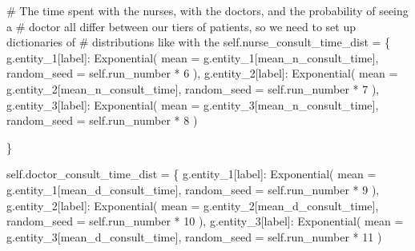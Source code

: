 \documentclass[
  letterpaper,
  DIV=11,
  numbers=noendperiod]{scrreprt}
\newenvironment{Shaded}{}{}
\newcommand{\CommentTok}[1]{\textcolor[rgb]{0.42,0.45,0.49}{#1}}
\newcommand{\DecValTok}[1]{\textcolor[rgb]{0.00,0.36,0.77}{#1}}
\newcommand{\NormalTok}[1]{\textcolor[rgb]{0.14,0.16,0.18}{#1}}
\newcommand{\OperatorTok}[1]{\textcolor[rgb]{0.14,0.16,0.18}{#1}}
\newcommand{\StringTok}[1]{\textcolor[rgb]{0.01,0.18,0.38}{#1}}
\newcommand{\VariableTok}[1]{\textcolor[rgb]{0.89,0.38,0.04}{#1}}
\begin{document}
\begin{Shaded}
\begin{Highlighting}[]
        \CommentTok{\# The time spent with the nurses, with the doctors, and the probability of seeing a}
        \CommentTok{\# doctor all differ between our tiers of patients, so we need to set up dictionaries of}
        \CommentTok{\# distributions like with the}
        \VariableTok{self}\NormalTok{.nurse\_consult\_time\_dist }\OperatorTok{=}\NormalTok{ \{}
\NormalTok{            g.entity\_1[}\StringTok{\textquotesingle{}label\textquotesingle{}}\NormalTok{]: Exponential(}
\NormalTok{                mean }\OperatorTok{=}\NormalTok{ g.entity\_1[}\StringTok{\textquotesingle{}mean\_n\_consult\_time\textquotesingle{}}\NormalTok{],}
\NormalTok{                random\_seed }\OperatorTok{=} \VariableTok{self}\NormalTok{.run\_number }\OperatorTok{*} \DecValTok{6}
\NormalTok{                ),}
\NormalTok{            g.entity\_2[}\StringTok{\textquotesingle{}label\textquotesingle{}}\NormalTok{]: Exponential(}
\NormalTok{                mean }\OperatorTok{=}\NormalTok{ g.entity\_2[}\StringTok{\textquotesingle{}mean\_n\_consult\_time\textquotesingle{}}\NormalTok{],}
\NormalTok{                random\_seed }\OperatorTok{=} \VariableTok{self}\NormalTok{.run\_number }\OperatorTok{*} \DecValTok{7}
\NormalTok{                ),}
\NormalTok{            g.entity\_3[}\StringTok{\textquotesingle{}label\textquotesingle{}}\NormalTok{]: Exponential(}
\NormalTok{                mean }\OperatorTok{=}\NormalTok{ g.entity\_3[}\StringTok{\textquotesingle{}mean\_n\_consult\_time\textquotesingle{}}\NormalTok{],}
\NormalTok{                random\_seed }\OperatorTok{=} \VariableTok{self}\NormalTok{.run\_number }\OperatorTok{*} \DecValTok{8}
\NormalTok{                )}

\NormalTok{        \}}

        \VariableTok{self}\NormalTok{.doctor\_consult\_time\_dist }\OperatorTok{=}\NormalTok{ \{}
\NormalTok{            g.entity\_1[}\StringTok{\textquotesingle{}label\textquotesingle{}}\NormalTok{]: Exponential(}
\NormalTok{                mean }\OperatorTok{=}\NormalTok{ g.entity\_1[}\StringTok{\textquotesingle{}mean\_d\_consult\_time\textquotesingle{}}\NormalTok{],}
\NormalTok{                random\_seed }\OperatorTok{=} \VariableTok{self}\NormalTok{.run\_number }\OperatorTok{*} \DecValTok{9}
\NormalTok{                ),}
\NormalTok{            g.entity\_2[}\StringTok{\textquotesingle{}label\textquotesingle{}}\NormalTok{]: Exponential(}
\NormalTok{                mean }\OperatorTok{=}\NormalTok{ g.entity\_2[}\StringTok{\textquotesingle{}mean\_d\_consult\_time\textquotesingle{}}\NormalTok{],}
\NormalTok{                random\_seed }\OperatorTok{=} \VariableTok{self}\NormalTok{.run\_number }\OperatorTok{*} \DecValTok{10}
\NormalTok{                ),}
\NormalTok{            g.entity\_3[}\StringTok{\textquotesingle{}label\textquotesingle{}}\NormalTok{]: Exponential(}
\NormalTok{                mean }\OperatorTok{=}\NormalTok{ g.entity\_3[}\StringTok{\textquotesingle{}mean\_d\_consult\_time\textquotesingle{}}\NormalTok{],}
\NormalTok{                random\_seed }\OperatorTok{=} \VariableTok{self}\NormalTok{.run\_number }\OperatorTok{*} \DecValTok{11}
\NormalTok{                )}


\end{Highlighting}
\end{Shaded}
\end{document}

